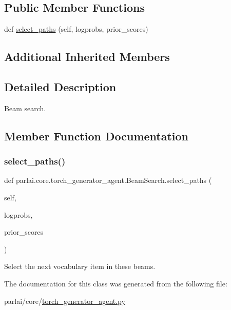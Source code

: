 \subsection*{Public Member Functions}
\begin{DoxyCompactItemize}
\item 
def \hyperlink{classparlai_1_1core_1_1torch__generator__agent_1_1BeamSearch_a3d67c12c987514ad263418ca2d98bbba}{select\+\_\+paths} (self, logprobs, prior\+\_\+scores)
\end{DoxyCompactItemize}
\subsection*{Additional Inherited Members}


\subsection{Detailed Description}
\begin{DoxyVerb}Beam search.
\end{DoxyVerb}
 

\subsection{Member Function Documentation}
\mbox{\label{classparlai_1_1core_1_1torch__generator__agent_1_1BeamSearch_a3d67c12c987514ad263418ca2d98bbba}} 
\subsubsection{\texorpdfstring{select\+\_\+paths()}{select\_paths()}}
{\footnotesize\ttfamily def parlai.\+core.\+torch\+\_\+generator\+\_\+agent.\+Beam\+Search.\+select\+\_\+paths (\begin{DoxyParamCaption}\item[{}]{self,  }\item[{}]{logprobs,  }\item[{}]{prior\+\_\+scores }\end{DoxyParamCaption})}

\begin{DoxyVerb}Select the next vocabulary item in these beams.
\end{DoxyVerb}
 

The documentation for this class was generated from the following file\+:\begin{DoxyCompactItemize}
\item 
parlai/core/\hyperlink{torch__generator__agent_8py}{torch\+\_\+generator\+\_\+agent.\+py}\end{DoxyCompactItemize}
